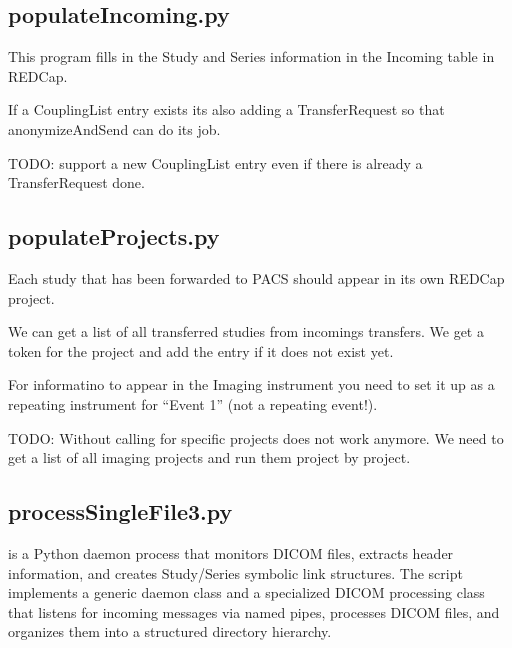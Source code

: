 \documentclass[letterpaper,10pt,english]{sphinxmanual}
\begin{document}
\sphinxstepscope


\subsection{populateIncoming.py}
\label{\detokenize{Architecture/scripts/populateIncoming:populateincoming-py}}\label{\detokenize{Architecture/scripts/populateIncoming::doc}}
\sphinxAtStartPar
This program fills in the Study and Series information in the Incoming table in REDCap.

\sphinxAtStartPar
If a CouplingList entry exists its also adding a TransferRequest so that anonymizeAndSend can do its job.

\sphinxAtStartPar
TODO: support a new CouplingList entry even if there is already a TransferRequest done.

\sphinxstepscope


\subsection{populateProjects.py}
\label{\detokenize{Architecture/scripts/populateProjects:populateprojects-py}}\label{\detokenize{Architecture/scripts/populateProjects::doc}}
\sphinxAtStartPar
Each study that has been forwarded to PACS should appear in its own REDCap project.

\sphinxAtStartPar
We can get a list of all transferred studies from incomings transfers. We get a token for the project and add the entry \sphinxhyphen{} if it does not exist yet.

\sphinxAtStartPar
For informatino to appear in the Imaging instrument you need to set it up as a repeating instrument for “Event 1” (not a repeating event!).

\sphinxAtStartPar
TODO: Without calling for specific projects does not work anymore. We need to get a list of all imaging projects and run them project by project.

\sphinxstepscope


\subsection{processSingleFile3.py}
\label{\detokenize{Architecture/scripts/processSingleFile3:processsinglefile3-py}}\label{\detokenize{Architecture/scripts/processSingleFile3::doc}}
\sphinxAtStartPar
{} is a Python daemon process that monitors DICOM files, extracts header information, and creates Study/Series symbolic link structures. The script implements a generic daemon class and a specialized DICOM processing class that listens for incoming messages via named pipes, processes DICOM files, and organizes them into a structured directory hierarchy.
\end{document}

